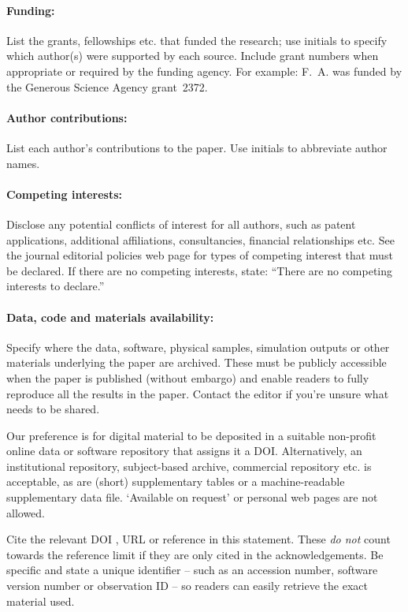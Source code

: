\documentclass[12pt]{article}
\begin{document}
\paragraph*{Funding:}
List the grants, fellowships etc. that funded the research;
use initials to specify which author(s) were supported by each source.
Include grant numbers when appropriate or required by the funding agency.
For example: F.~A. was funded by the Generous Science Agency grant~2372.
\paragraph*{Author contributions:}
List each author’s contributions to the paper.
Use initials to abbreviate author names.
\paragraph*{Competing interests:}
Disclose any potential conflicts of interest for all authors, such as patent applications,
additional affiliations, consultancies, financial relationships etc.
See the journal editorial policies web page for types of competing interest that must be declared.
If there are no competing interests, state:
``There are no competing interests to declare.''
\paragraph*{Data, code and materials availability:}
Specify where the data, software, physical samples, simulation outputs or other materials
underlying the paper are archived.
These must be publicly accessible when the paper is published (without embargo) and enable
readers to fully reproduce all the results in the paper.
Contact the editor if you’re unsure what needs to be shared.

Our preference is for digital material to be deposited in a suitable non-profit online data or
software repository that assigns it a DOI.
Alternatively, an institutional repository, subject-based archive, commercial repository etc.
is acceptable, as are (short) supplementary tables or a machine-readable supplementary data file.
`Available on request’ or personal web pages are not allowed.

Cite the relevant DOI \cite{dataset}, URL \cite{example_url} or reference \cite{example2}
in this statement.
These \textit{do not} count towards the reference limit if they are only cited in the acknowledgements.
Be specific and state a unique identifier -- such as an accession number, software version number
or observation ID -- so readers can easily retrieve the exact material used.
\end{document}
